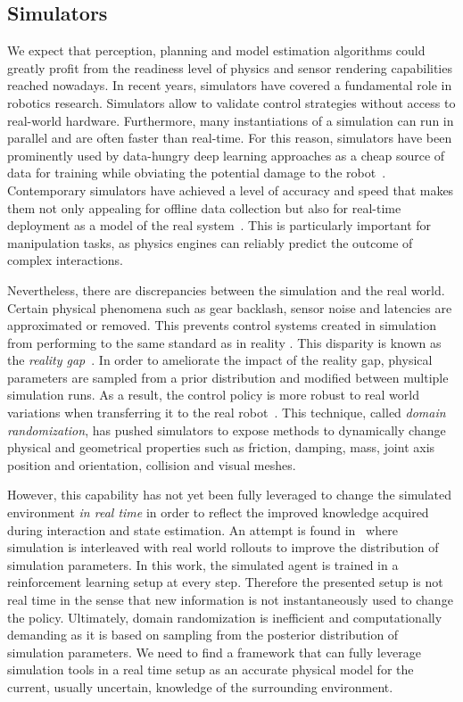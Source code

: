 \subsection{Simulators}
We expect that perception, planning and model estimation algorithms could greatly profit from the readiness level of physics and sensor rendering capabilities reached nowadays.  
In recent years, simulators have covered a fundamental role in robotics research. Simulators allow to validate control strategies without access to real-world hardware. Furthermore, many instantiations of a simulation can run in parallel and are often faster than real-time.  For this reason, simulators have been prominently used by data-hungry deep learning approaches as a cheap source of data for training while obviating the potential damage to the robot~\cite{liang_gpu-accelerated_2018}.
Contemporary simulators have achieved a level of accuracy and speed that makes them not only appealing for offline data collection but also for real-time deployment as a model of the real system~\cite{sim-benchmarks}. This is particularly important for manipulation tasks, as physics engines can reliably predict the outcome of complex interactions.  

Nevertheless, there are discrepancies between the simulation and the real world. Certain physical phenomena such as gear backlash, sensor noise and latencies are approximated or removed. This prevents control systems created in simulation from performing to the same standard as in reality \cite{collins_benchmarking_2020}. This disparity is known as the \emph{reality gap}~\cite{hofer2021sim2real}. In order to ameliorate the impact of the reality gap, physical parameters are sampled from a prior distribution and modified between multiple simulation runs. As a result, the control policy is more robust to real world variations when transferring it to the real robot~\cite{andrychowicz2020learning}. This technique, called \emph{domain randomization}, has pushed simulators to expose methods to dynamically change physical and geometrical properties such as friction, damping, mass, joint axis position and orientation, collision and visual meshes.

However, this capability has not yet been fully leveraged to change the simulated environment \emph{in real time} in order to reflect the improved knowledge acquired during interaction and state estimation. An attempt is found in~\cite{chebotar2019closing} where simulation is interleaved with real world rollouts to improve the distribution of simulation parameters. In this work, the simulated agent is trained in a reinforcement learning setup at every step. Therefore the presented setup is not real time in the sense that new information is not instantaneously used to change the policy. Ultimately, domain randomization is inefficient and computationally demanding as it is based on sampling from the posterior distribution of simulation parameters. We need to find a framework that can fully leverage simulation tools in a real time setup as an accurate physical model for the current, usually uncertain, knowledge of the surrounding environment.
